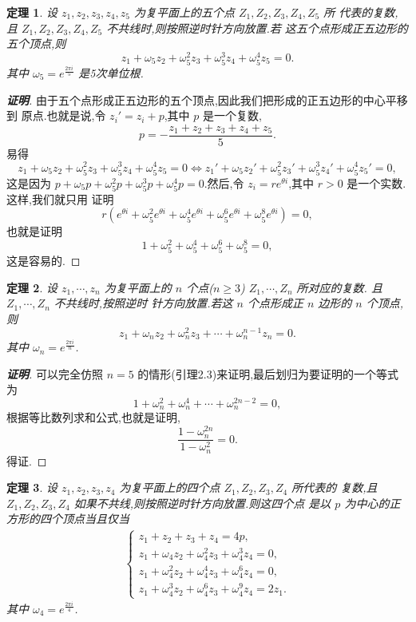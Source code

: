 \documentclass[twoside,11pt]{article}
\newtheorem{lemma}{定理}
\begin{document}
\begin{lemma}
  设 $z_1,z_2,z_3,z_4,z_5$ 为复平面上的五个点 $Z_1,Z_2,Z_3,Z_4,Z_5$ 所
  代表的复数,且 $Z_1,Z_2,Z_3,Z_4,Z_5$ 不共线时,则按照逆时针方向放置.若
  这五个点形成正五边形的五个顶点,则
$$
z_1+\omega_5 z_2+\omega_5^2 z_3+\omega_5^3 z_4+\omega_5^4 z_5=0.
$$
其中 $\omega_5=e^{\frac{2\pi i}{5}}$ 是5次单位根.
\end{lemma}
\begin{proof}[\bf{证明}]
  由于五个点形成正五边形的五个顶点,因此我们把形成的正五边形的中心平移到
  原点.也就是说,令 $z_i'=z_i+p$,其中 $p$ 是一个复数,
$$
p=-\frac{z_1+z_2+z_3+z_4+z_5}{5}.
$$
易得
$$
z_1+\omega_5 z_2+\omega_5^2 z_3+\omega_5^3 z_4+\omega_5^4 z_5=0 \iff
z_1'+\omega_5 z_2'+\omega_5^2 z_3'+\omega_5^3 z_4'+\omega_5^4 z_5'=0,
$$
这是因为 $p+\omega_5 p+\omega_5^2 p+\omega_5^3 p+\omega_5^4
p=0$.然后,令 $z_i=re^{\theta i}$,其中 $r>0$ 是一个实数.这样,我们就只用
证明
$$
r(e^{\theta i}+\omega_5^2e^{\theta i}+\omega_5^4e^{\theta
  i}+\omega_5^6e^{\theta i}+\omega_5^8e^{\theta i})=0,
$$
也就是证明
$$
1+\omega_5^2+\omega_5^4+\omega_5^6+\omega_5^8=0,
$$
这是容易的.
\end{proof}
\begin{lemma}
  设 $z_1,\cdots,z_n$ 为复平面上的 $n$ 个点($n\geq 3$)
  $Z_1,\cdots,Z_n$ 所对应的复数. 且 $Z_1,\cdots,Z_n$ 不共线时,按照逆时
  针方向放置.若这 $n$ 个点形成正 $n$ 边形的 $n$ 个顶点,则
$$
z_1+\omega_nz_2+\omega_n^2z_3+\cdots+\omega_n^{n-1}z_n=0.
$$
其中 $\omega_n=e^{\frac{2\pi i}{n}}$.
\end{lemma}
\begin{proof}[\textbf{证明}]
  可以完全仿照 $n=5$ 的情形(引理2.3)来证明,最后划归为要证明的一个等式为
$$
1+\omega_n^2+\omega_n^4+\cdots+\omega_n^{2n-2}=0,
$$
根据等比数列求和公式,也就是证明,
$$
\frac{1-\omega_n^{2n}}{1-\omega_n^2}=0.
$$
得证.
\end{proof}
\begin{lemma}
  设 $z_1,z_2,z_3,z_{4}$ 为复平面上的四个点 $Z_1,Z_2,Z_3,Z_4$ 所代表的
  复数,且$Z_1,Z_2,Z_3,Z_{4}$ 如果不共线,则按照逆时针方向放置.则这四个点
  是以 $p$ 为中心的正方形的四个顶点当且仅当
  \begin{eqnarray}
    \begin{cases}
z_1+z_2+z_3+z_4=4p,\\
      z_1+\omega_{4} z_2+\omega_{4}^2z_3+\omega_4^3z_{4}=0,\\
      z_1+\omega_4^2z_2+\omega_4^4z_3+\omega_4^6z_4=0,\\
     z_1+\omega_4^3z_2+\omega_4^6z_3+\omega_4^9z_4=2z_1.
    \end{cases}
  \end{eqnarray}
  其中 $\omega_4=e^{\frac{2\pi i}{4}}$.
\end{lemma}
\end{document}
